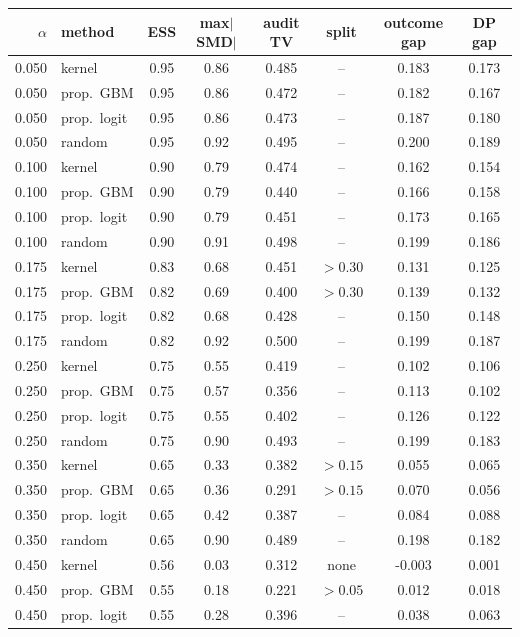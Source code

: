 \begin{tabular}{rlcccccc}
\toprule
$\alpha$ & method & ESS & max$|$SMD$|$ & audit TV & split & outcome gap & DP gap \\
\midrule
0.050 & kernel & 0.95 & 0.86 & 0.485 & -- & 0.183 & 0.173 \\
0.050 & prop.\ GBM & 0.95 & 0.86 & 0.472 & -- & 0.182 & 0.167 \\
0.050 & prop.\ logit & 0.95 & 0.86 & 0.473 & -- & 0.187 & 0.180 \\
0.050 & random & 0.95 & 0.92 & 0.495 & -- & 0.200 & 0.189 \\
\midrule
0.100 & kernel & 0.90 & 0.79 & 0.474 & -- & 0.162 & 0.154 \\
0.100 & prop.\ GBM & 0.90 & 0.79 & 0.440 & -- & 0.166 & 0.158 \\
0.100 & prop.\ logit & 0.90 & 0.79 & 0.451 & -- & 0.173 & 0.165 \\
0.100 & random & 0.90 & 0.91 & 0.498 & -- & 0.199 & 0.186 \\
\midrule
0.175 & kernel & 0.83 & 0.68 & 0.451 & $>0.30$ & 0.131 & 0.125 \\
0.175 & prop.\ GBM & 0.82 & 0.69 & 0.400 & $>0.30$ & 0.139 & 0.132 \\
0.175 & prop.\ logit & 0.82 & 0.68 & 0.428 & -- & 0.150 & 0.148 \\
0.175 & random & 0.82 & 0.92 & 0.500 & -- & 0.199 & 0.187 \\
\midrule
0.250 & kernel & 0.75 & 0.55 & 0.419 & -- & 0.102 & 0.106 \\
0.250 & prop.\ GBM & 0.75 & 0.57 & 0.356 & -- & 0.113 & 0.102 \\
0.250 & prop.\ logit & 0.75 & 0.55 & 0.402 & -- & 0.126 & 0.122 \\
0.250 & random & 0.75 & 0.90 & 0.493 & -- & 0.199 & 0.183 \\
\midrule
0.350 & kernel & 0.65 & 0.33 & 0.382 & $>0.15$ & 0.055 & 0.065 \\
0.350 & prop.\ GBM & 0.65 & 0.36 & 0.291 & $>0.15$ & 0.070 & 0.056 \\
0.350 & prop.\ logit & 0.65 & 0.42 & 0.387 & -- & 0.084 & 0.088 \\
0.350 & random & 0.65 & 0.90 & 0.489 & -- & 0.198 & 0.182 \\
\midrule
0.450 & kernel & 0.56 & 0.03 & 0.312 & none & -0.003 & 0.001 \\
0.450 & prop.\ GBM & 0.55 & 0.18 & 0.221 & $>0.05$ & 0.012 & 0.018 \\
0.450 & prop.\ logit & 0.55 & 0.28 & 0.396 & -- & 0.038 & 0.063 \\

\end{tabular}
